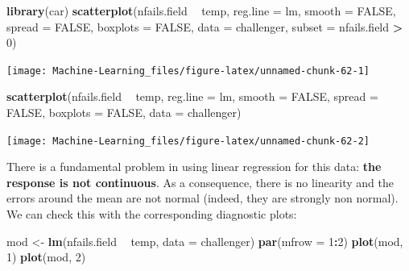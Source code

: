 \documentclass[]{book}
\newenvironment{Shaded}{\begin{snugshade}}{\end{snugshade}}
\newcommand{\KeywordTok}[1]{\textcolor[rgb]{0.13,0.29,0.53}{\textbf{#1}}}
\newcommand{\DataTypeTok}[1]{\textcolor[rgb]{0.13,0.29,0.53}{#1}}
\newcommand{\DecValTok}[1]{\textcolor[rgb]{0.00,0.00,0.81}{#1}}
\newcommand{\StringTok}[1]{\textcolor[rgb]{0.31,0.60,0.02}{#1}}
\newcommand{\OtherTok}[1]{\textcolor[rgb]{0.56,0.35,0.01}{#1}}
\newcommand{\OperatorTok}[1]{\textcolor[rgb]{0.81,0.36,0.00}{\textbf{#1}}}
\newcommand{\NormalTok}[1]{#1}
\theoremstyle{definition}
\theoremstyle{definition}
\theoremstyle{definition}
\theoremstyle{remark}
\begin{document}
\begin{Shaded}
\begin{Highlighting}[]
\KeywordTok{library}\NormalTok{(car)}
\KeywordTok{scatterplot}\NormalTok{(nfails.field }\OperatorTok{~}\StringTok{ }\NormalTok{temp, }\DataTypeTok{reg.line =}\NormalTok{ lm, }\DataTypeTok{smooth =} \OtherTok{FALSE}\NormalTok{, }\DataTypeTok{spread =} \OtherTok{FALSE}\NormalTok{,}
            \DataTypeTok{boxplots =} \OtherTok{FALSE}\NormalTok{, }\DataTypeTok{data =}\NormalTok{ challenger, }\DataTypeTok{subset =}\NormalTok{ nfails.field }\OperatorTok{>}\StringTok{ }\DecValTok{0}\NormalTok{)}
\end{Highlighting}
\end{Shaded}

\begin{center}\texttt{[image: Machine-Learning\_files/figure-latex/unnamed-chunk-62-1]} \end{center}

\begin{Shaded}
\begin{Highlighting}[]
\KeywordTok{scatterplot}\NormalTok{(nfails.field }\OperatorTok{~}\StringTok{ }\NormalTok{temp, }\DataTypeTok{reg.line =}\NormalTok{ lm, }\DataTypeTok{smooth =} \OtherTok{FALSE}\NormalTok{, }\DataTypeTok{spread =} \OtherTok{FALSE}\NormalTok{,}
            \DataTypeTok{boxplots =} \OtherTok{FALSE}\NormalTok{, }\DataTypeTok{data =}\NormalTok{ challenger)}
\end{Highlighting}
\end{Shaded}

\begin{center}\texttt{[image: Machine-Learning\_files/figure-latex/unnamed-chunk-62-2]} \end{center}

There is a fundamental problem in using linear regression for this data:
\textbf{the response is not continuous}. As a consequence, there is no
linearity and the errors around the mean are not normal (indeed, they
are strongly non normal). We can check this with the corresponding
diagnostic plots:

\begin{Shaded}
\begin{Highlighting}[]
\NormalTok{mod <-}\StringTok{ }\KeywordTok{lm}\NormalTok{(nfails.field }\OperatorTok{~}\StringTok{ }\NormalTok{temp, }\DataTypeTok{data =}\NormalTok{ challenger)}
\KeywordTok{par}\NormalTok{(}\DataTypeTok{mfrow =} \DecValTok{1}\OperatorTok{:}\DecValTok{2}\NormalTok{)}
\KeywordTok{plot}\NormalTok{(mod, }\DecValTok{1}\NormalTok{)}
\KeywordTok{plot}\NormalTok{(mod, }\DecValTok{2}\NormalTok{)}
\end{Highlighting}
\end{Shaded}
\end{document}
